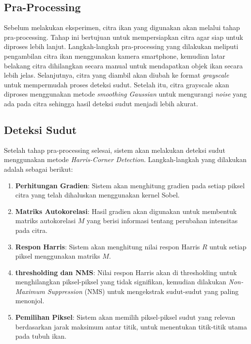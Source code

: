 \subsection{Pra-Processing}
    Sebelum melakukan eksperimen, citra ikan yang digunakan akan melalui tahap pra-processing. 
Tahap ini bertujuan untuk mempersiapkan citra agar siap untuk diproses lebih lanjut. 
Langkah-langkah pra-processing yang dilakukan meliputi pengambilan citra ikan menggunakan kamera smartphone, kemudian latar belakang citra dihilangkan secara manual untuk mendapatkan objek ikan secara lebih jelas. 
Selanjutnya, citra yang diambil akan diubah ke format \emph{grayscale} untuk mempermudah proses deteksi sudut. 
Setelah itu, citra grayscale akan diproses menggunakan metode \emph{smoothing Gaussian} untuk mengurangi \emph{noise} yang ada pada citra sehingga hasil deteksi sudut menjadi lebih akurat.

\subsection{Deteksi Sudut}
    Setelah tahap pra-processing selesai, sistem akan melakukan deteksi sudut menggunakan metode \emph{Harris-Corner Detection}. Langkah-langkah yang dilakukan adalah sebagai berikut: 
    \begin{enumerate}
        \setlength{\parskip}{0pt}
            \item \textbf{Perhitungan Gradien}: Sistem akan menghitung gradien pada setiap piksel citra yang telah dihaluskan menggunakan kernel Sobel.
            \item \textbf{Matriks Autokorelasi}: Hasil gradien akan digunakan untuk membentuk matriks autokorelasi \(M\) yang berisi informasi tentang perubahan intensitas pada citra.
            \item \textbf{Respon Harris}: Sistem akan menghitung nilai respon Harris \(R\) untuk setiap piksel menggunakan matriks \(M\).
            \item \textbf{thresholding dan NMS}: Nilai respon Harris akan di thresholding untuk menghilangkan piksel-piksel yang tidak signifikan, kemudian dilakukan \emph{Non-Maximum Suppression} (NMS) untuk mengekstrak sudut-sudut yang paling menonjol.
            \item \textbf{Pemilihan Piksel}: Sistem akan memilih piksel-piksel sudut yang relevan berdasarkan jarak maksimum antar titik, untuk menentukan titik-titik utama pada tubuh ikan.
        \end{enumerate}

